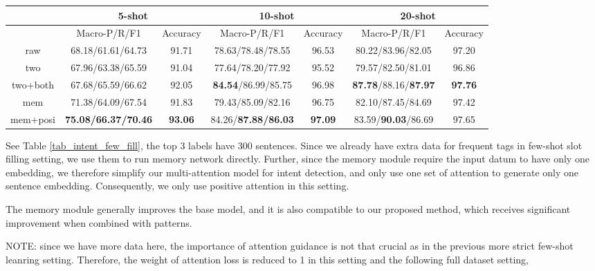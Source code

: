 \begin{table*}
\setlength{\tabcolsep}{0.23em}
\centering
\small{
\begin{tabular}{|c|c|c|c|c|c|c|}

\hline
  & \multicolumn{2}{|c|}{5-shot} & \multicolumn{2}{|c|}{10-shot} & \multicolumn{2}{|c|}{20-shot}  \\
 \hline
  & Macro-P/R/F1 & Accuracy & Macro-P/R/F1 & Accuracy  & Macro-P/R/F1 & Accuracy   \\
\hline
raw & 68.18/61.61/64.73 & 91.71 & 78.63/78.48/78.55 & 96.53 & 80.22/83.96/82.05 & 97.20 \\
\hline
two & 67.96/63.38/65.59 & 91.04 & 77.64/78.20/77.92 & 95.52 & 79.57/82.50/81.01 & 96.86 \\
\hline
two+both & 67.68/65.59/66.62 & 92.05 & \textbf{84.54}/86.99/85.75 & 96.98 & \textbf{87.78}/88.16/\textbf{87.97} & \textbf{97.76} \\
\hline
mem & 71.38/64.09/67.54 & 91.83 & 79.43/85.09/82.16 & 96.75 & 82.10/87.45/84.69 & 97.42 \\
\hline
mem+posi & \textbf{75.08/66.37/70.46} & \textbf{93.06} & 84.26/\textbf{87.88/86.03} & \textbf{97.09} & 83.59/\textbf{90.03}/86.69 & 97.65 \\
\hline

\end{tabular}
}
\caption{Intent Detection Result on Few-Shot Data with the Top 3 Intents Having 300 Sentences.}
\label{tab_intent_few_fill}
\end{table*}
See Table \ref{tab_intent_few_fill}, the top 3 labels have 300 sentences. Since we already have extra data for frequent tags in few-shot slot filling setting, we use them to run memory network directly. Further, since the memory module require the input datum to have only one embedding, we therefore simplify our multi-attention model for intent detection, and only use one set of attention to generate only one sentence embedding. Consequently, we only use positive attention in this setting.

The memory module generally improves the base model, and it is also compatible to our proposed method, which receives significant improvement when combined with \RE patterns.

NOTE: since we have more data here, the importance of attention guidance is not that crucial as in the previous more strict few-shot leanring setting. Therefore, the weight of attention loss is reduced to 1 in this setting and the following full dataset setting, 


